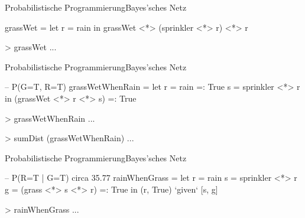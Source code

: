 \documentclass{beamer}
\begin{document}
\begin{frame}[fragile]{Probabilistische Programmierung}{Bayes'sches Netz}
\small
\begin{semiverbatim}
grassWet =
  let r = rain
  in grassWet <*> (sprinkler <*> r) <*> r
\end{semiverbatim}
\vfill
\begin{semiverbatim}
> grassWet
...
\end{semiverbatim}
\vfill
\end{frame}

\begin{frame}[fragile]{Probabilistische Programmierung}{Bayes'sches Netz}
\small
\begin{semiverbatim}
-- P(G=T, R=T)
grassWetWhenRain =
  let r = rain =: True
      s = sprinkler <*> r
  in (grassWet <*> r <*> s) =: True
\end{semiverbatim}
\vfill
\begin{semiverbatim}
> grassWetWhenRain
...

> sumDist (grassWetWhenRain)
...
\end{semiverbatim}
\vfill
\end{frame}

\begin{frame}[fragile]{Probabilistische Programmierung}{Bayes'sches Netz}
\small
\begin{semiverbatim}
-- P(R=T | G=T) circa 35.77 %
rainWhenGrass =
  let r = rain
      s = sprinkler <*> r
      g = (grass <*> s <*> r) =: True
  in (r, True) `given` [s, g]
\end{semiverbatim}
\vfill
\begin{semiverbatim}
> rainWhenGrass
...
\end{semiverbatim}
\vfill
\end{frame}
\end{document}
